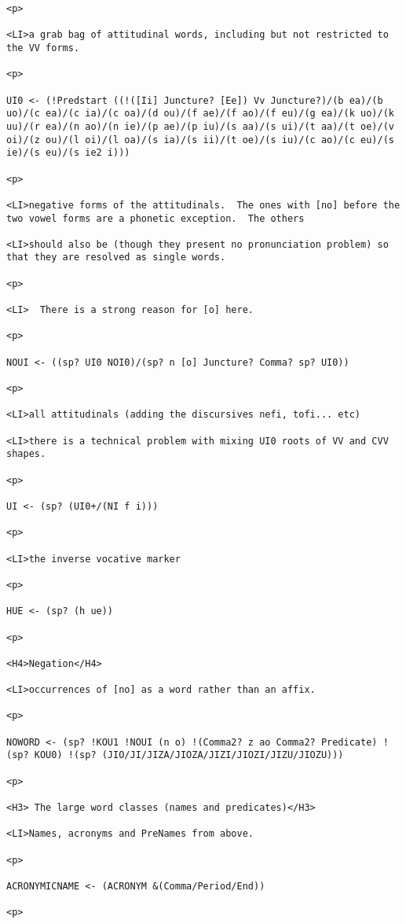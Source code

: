 \documentclass[12pt]{article}
\begin{document}
\begin{lstlisting}
<p>

<LI>a grab bag of attitudinal words, including but not restricted to the VV forms.

<p>

UI0 <- (!Predstart ((!([Ii] Juncture? [Ee]) Vv Juncture?)/(b ea)/(b uo)/(c ea)/(c ia)/(c oa)/(d ou)/(f ae)/(f ao)/(f eu)/(g ea)/(k uo)/(k uu)/(r ea)/(n ao)/(n ie)/(p ae)/(p iu)/(s aa)/(s ui)/(t aa)/(t oe)/(v oi)/(z ou)/(l oi)/(l oa)/(s ia)/(s ii)/(t oe)/(s iu)/(c ao)/(c eu)/(s ie)/(s eu)/(s ie2 i)))

<p>

<LI>negative forms of the attitudinals.  The ones with [no] before the two vowel forms are a phonetic exception.  The others

<LI>should also be (though they present no pronunciation problem) so that they are resolved as single words.

<p>

<LI>  There is a strong reason for [o] here.

<p>

NOUI <- ((sp? UI0 NOI0)/(sp? n [o] Juncture? Comma? sp? UI0))

<p>

<LI>all attitudinals (adding the discursives nefi, tofi... etc)

<LI>there is a technical problem with mixing UI0 roots of VV and CVV shapes.

<p>

UI <- (sp? (UI0+/(NI f i)))

<p>

<LI>the inverse vocative marker

<p>

HUE <- (sp? (h ue))

<p>

<H4>Negation</H4>

<LI>occurrences of [no] as a word rather than an affix.

<p>

NOWORD <- (sp? !KOU1 !NOUI (n o) !(Comma2? z ao Comma2? Predicate) !(sp? KOU0) !(sp? (JIO/JI/JIZA/JIOZA/JIZI/JIOZI/JIZU/JIOZU)))

<p>

<H3> The large word classes (names and predicates)</H3>

<LI>Names, acronyms and PreNames from above.

<p>

ACRONYMICNAME <- (ACRONYM &(Comma/Period/End))

<p>


\end{lstlisting}
\end{document}
